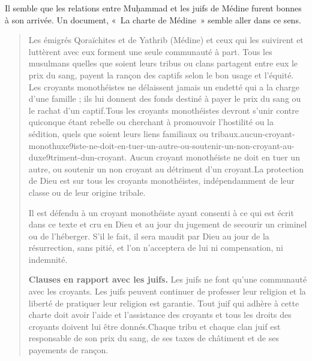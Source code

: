 Il semble que les relations entre Muḥammad et les juifs de Médine furent
bonnes à son arrivée. Un document, «~La charte de Médine~» semble aller
dans ce sens.

\begin{quote}
 \begin{footnotesize}
 
 
{Les émigrés Qoraïchites et de Yathrib (Médine) et ceux
qui les suivirent et luttèrent avec eux forment une seule communauté à
part. Tous les musulmans quelles que soient leurs tribus ou
clans partagent entre eux le prix du sang, payent la rançon des captifs
selon le bon usage et
l'équité.
Les croyants monothéistes ne délaissent jamais un endetté
qui a la charge d'une famille ; ils lui donnent des fonds destiné à
payer le prix du sang ou le rachat d'un
captif.Tous les croyants monothéistes devront s'unir contre
quiconque étant rebelle ou cherchant à promouvoir l'hostilité ou la
sédition, quels que soient leurs liens familiaux ou
tribaux.aucun-croyant-monothuxe9iste-ne-doit-en-tuer-un-autre-ou-soutenir-un-non-croyant-au-duxe9triment-dun-croyant. Aucun croyant monothéiste ne doit en tuer un autre, ou
soutenir un non croyant au détriment d'un
croyant.La protection de Dieu est sur tous les croyants
monothéistes, indépendamment de leur classe ou de leur origine
tribale.} 
 
 
{Il est défendu à un croyant monothéiste ayant consenti à
ce qui est écrit dans ce texte et cru en Dieu et au jour du jugement de
secourir un criminel ou de l'héberger. S'il le fait, il sera maudit par
Dieu au jour de la résurrection, sans pitié, et l'on n'acceptera de lui
ni compensation, ni
indemnité.}
 
{\textbf{Clauses en rapport avec les
juifs.} Les juifs ne font qu'une communauté avec les
croyants. Les juifs peuvent continuer de professer leur religion et
la liberté de pratiquer leur religion est
garantie.   Tout juif qui adhère à cette charte doit avoir l'aide et
l'assistance des croyants et tous les droits des croyants doivent lui
être
donnés.Chaque tribu et chaque clan juif est responsable de son
prix du sang, de ses taxes de châtiment et de ses payements de
rançon.} 
 

\end{footnotesize}
\end{quote}
